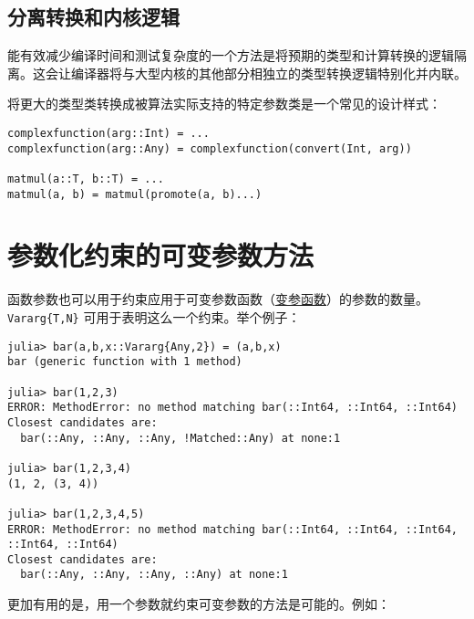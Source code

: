 \hypertarget{1067448927897925814}{}


\subsection{分离转换和内核逻辑}



能有效减少编译时间和测试复杂度的一个方法是将预期的类型和计算转换的逻辑隔离。这会让编译器将与大型内核的其他部分相独立的类型转换逻辑特别化并内联。



将更大的类型类转换成被算法实际支持的特定参数类是一个常见的设计样式：




\begin{verbatim}
complexfunction(arg::Int) = ...
complexfunction(arg::Any) = complexfunction(convert(Int, arg))

matmul(a::T, b::T) = ...
matmul(a, b) = matmul(promote(a, b)...)
\end{verbatim}



\hypertarget{3661198273813942193}{}


\section{参数化约束的可变参数方法}



函数参数也可以用于约束应用于{\textquotedbl}可变参数{\textquotedbl}函数（\hyperlink{9965084594348935329}{变参函数}）的参数的数量。\texttt{Vararg\{T,N\}} 可用于表明这么一个约束。举个例子：




\begin{verbatim}
julia> bar(a,b,x::Vararg{Any,2}) = (a,b,x)
bar (generic function with 1 method)

julia> bar(1,2,3)
ERROR: MethodError: no method matching bar(::Int64, ::Int64, ::Int64)
Closest candidates are:
  bar(::Any, ::Any, ::Any, !Matched::Any) at none:1

julia> bar(1,2,3,4)
(1, 2, (3, 4))

julia> bar(1,2,3,4,5)
ERROR: MethodError: no method matching bar(::Int64, ::Int64, ::Int64, ::Int64, ::Int64)
Closest candidates are:
  bar(::Any, ::Any, ::Any, ::Any) at none:1
\end{verbatim}



更加有用的是，用一个参数就约束可变参数的方法是可能的。例如：




